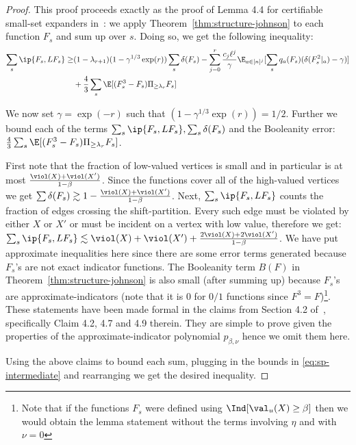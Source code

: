 \begin{proof}
This proof proceeds exactly as the proof of Lemma 4.4 for certifiable small-set expanders in~\cite{BBKSS}:
we apply Theorem~\ref{thm:structure-johnson} to each function $F_s$ and sum up over $s$. Doing so, we get the following inequality:
\begin{align}
\sum_s \ip{F_s, LF_s} \geq &(1 - \lambda_{r+1})(1- \gamma^{1/3}\exp(r))\sum_s \delta(F_s) - \sum_{j = 0}^r \frac{c_j \ell^j}{\gamma} \E_{a \in [n]^j}[\sum_{s}q_{a}(F_s)(\delta(F_s^{2}|_a) - \gamma)] \notag\\
&+ \frac{4}{3}\sum_s \E[(F_s^3 - F_s)\Pi_{\geq \lambda_r} F_{s}] \label{eq:sp-intermediate}
\end{align}

We now set $\gamma = \exp(-r)$ such that $(1-\gamma^{1/3}\exp(r)) = 1/2$. Further we bound each of the terms $\sum_s \ip{F_s, LF_s}, \sum_s \delta(F_s)$ and the Booleanity error: $\frac{4}{3}\sum_s \E[(F_s^3 - F_s)\Pi_{\geq \lambda_r} F_{s}]$.

First note that the fraction of low-valued vertices is small and in particular is at most $\frac{\viol(X)+\viol(X')}{1-\beta}$. Since the functions cover all of the high-valued vertices we get $\sum \delta(F_s) \gtrsim 1 - \frac{\viol(X) + \viol(X')}{1-\beta}$. Next, $\sum_s \ip{F_s, LF_s}$ counts the fraction of edges crossing the shift-partition. Every such edge must be violated by either $X$ or $X'$ or must be incident on a vertex with low value, therefore we get:  $\sum_s \ip{F_s, LF_s} \lesssim \viol(X)+\viol(X')+ \frac{2\viol(X)+2\viol(X')}{1-\beta}$.  We have put approximate inequalities here since there are some error terms generated because $F_s$'s are not exact indicator functions. 
The Booleanity term $B(F)$ in Theorem~\ref{thm:structure-johnson} is also small (after summing up) because $F_s$'s are approximate-indicators (note that it is $0$ for $0/1$ functions since $F^3 = F$)\footnote{Note that if the functions $F_s$ were defined using $\Ind[\val_u(X)\geq \beta]$ then we would obtain the lemma statement without the terms involving $\eta$ and with $\nu = 0$}. These statements have been made formal in the claims from Section 4.2 of~\cite{BBKSS}, specifically Claim 4.2, 4.7 and 4.9 therein. They are simple to prove given the properties of the approximate-indicator polynomial $p_{\beta,\nu}$ hence we omit them here. 

Using the above claims to bound each sum, plugging in the bounds in \eqref{eq:sp-intermediate} and rearranging we get the desired inequality.

\end{proof}

